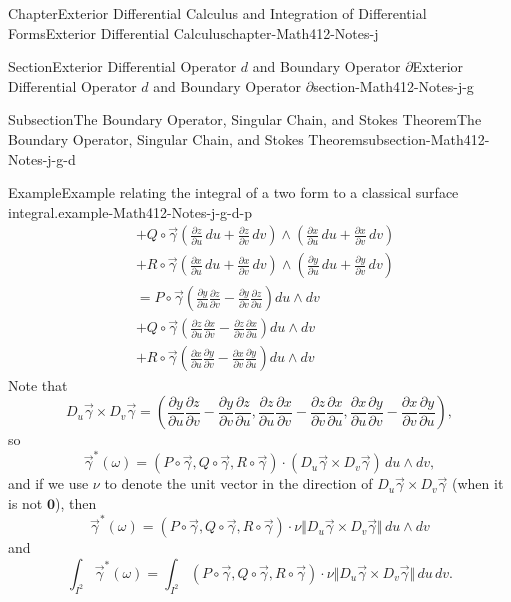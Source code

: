 \documentclass[oneside,10pt,]{book}
\numberwithin{equation}{section}
\newcommand{\vg}{{\vec{\gamma}}}
\newcommand{\amp}{&}
\begin{document}
\begin{chapterptx}{Chapter}{Exterior Differential Calculus and Integration of Differential Forms}{}{Exterior Differential Calculus}{}{}{chapter-Math412-Notes-j}
\begin{sectionptx}{Section}{Exterior Differential Operator \(d\) and Boundary Operator \(\partial\)}{}{Exterior Differential Operator \(d\) and Boundary Operator \(\partial\)}{}{}{section-Math412-Notes-j-g}
\begin{subsectionptx}{Subsection}{The Boundary Operator, Singular Chain, and Stokes Theorem}{}{The Boundary Operator, Singular Chain, and Stokes Theorem}{}{}{subsection-Math412-Notes-j-g-d}
\begin{example}{Example}{Example relating the integral of a two form to a classical surface integral.}{example-Math412-Notes-j-g-d-p}
\begin{align*}
\amp + Q\circ \vg \left(\frac{\partial z}{\partial u} \, du + \frac{\partial z}{\partial v} \, dv\right)
\wedge \left(\frac{\partial x}{\partial u} \, du + \frac{\partial x}{\partial v} \, dv\right) \\
\amp + R\circ \vg \left(\frac{\partial x}{\partial u} \, du + \frac{\partial x}{\partial v} \, dv\right)
\wedge \left(\frac{\partial y}{\partial u} \, du + \frac{\partial y}{\partial v} \, dv\right) \\
\amp= P\circ \vg \left(\frac{\partial y}{\partial u} \frac{\partial z}{\partial v}- 
\frac{\partial y}{\partial v} \frac{\partial z}{\partial u}  \right) du\wedge dv \\
\amp+ Q\circ \vg \left(\frac{\partial z}{\partial u} \frac{\partial x}{\partial v}- 
\frac{\partial z}{\partial v} \frac{\partial x}{\partial u}  \right) du\wedge dv \\
\amp+ R\circ \vg \left(\frac{\partial x}{\partial u} \frac{\partial y}{\partial v}- 
\frac{\partial x}{\partial v} \frac{\partial y}{\partial u}  \right) du\wedge dv 
\end{align*}
Note that%
\begin{equation*}
D_{u}\vg\times D_{v}\vg=\left( \frac{\partial y}{\partial u} \frac{\partial z}{\partial v}- 
\frac{\partial y}{\partial v} \frac{\partial z}{\partial u}, \frac{\partial z}{\partial u} \frac{\partial x}{\partial v}- 
\frac{\partial z}{\partial v} \frac{\partial x}{\partial u}, 
\frac{\partial x}{\partial u} \frac{\partial y}{\partial v}- 
\frac{\partial x}{\partial v} \frac{\partial y}{\partial u}\right),
\end{equation*}
so%
\begin{equation*}
\vg^{*}(\omega)=(P\circ \vg, Q\circ \vg, R\circ \vg) \cdot \left( D_{u}\vg\times D_{v}\vg\right)\,
du\wedge dv,
\end{equation*}
and if we use \(\nu\) to denote the unit vector in the direction of \(D_{u}\vg\times D_{v}\vg\) (when it is not \(\mathbf 0\)), then%
\begin{equation*}
\vg^{*}(\omega)=(P\circ \vg, Q\circ \vg, R\circ \vg)\cdot \nu  \Vert D_{u}\vg\times D_{v}\vg\Vert
\, du\wedge dv
\end{equation*}
and%
\begin{equation*}
\int_{I^{2}} \vg^{*}(\omega)= \int_{I^{2}} (P\circ \vg, Q\circ \vg, R\circ \vg)\cdot \nu  \Vert D_{u}\vg\times D_{v}\vg\Vert \, du\, dv.
\end{equation*}

\end{example}
\end{subsectionptx}
\end{sectionptx}
\end{chapterptx}
\end{document}

